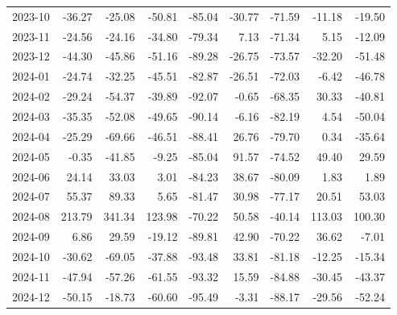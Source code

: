 \begin{table}[ht]
\begin{tabular}{lrrrrrrrr}
  2023-10 & -36.27 & -25.08 & -50.81 & -85.04 & -30.77 & -71.59 & -11.18 & -19.50 \\ 
  2023-11 & -24.56 & -24.16 & -34.80 & -79.34 & 7.13 & -71.34 & 5.15 & -12.09 \\ 
  2023-12 & -44.30 & -45.86 & -51.16 & -89.28 & -26.75 & -73.57 & -32.20 & -51.48 \\ 
  2024-01 & -24.74 & -32.25 & -45.51 & -82.87 & -26.51 & -72.03 & -6.42 & -46.78 \\ 
  2024-02 & -29.24 & -54.37 & -39.89 & -92.07 & -0.65 & -68.35 & 30.33 & -40.81 \\ 
  2024-03 & -35.35 & -52.08 & -49.65 & -90.14 & -6.16 & -82.19 & 4.54 & -50.04 \\ 
  2024-04 & -25.29 & -69.66 & -46.51 & -88.41 & 26.76 & -79.70 & 0.34 & -35.64 \\ 
  2024-05 & -0.35 & -41.85 & -9.25 & -85.04 & 91.57 & -74.52 & 49.40 & 29.59 \\ 
  2024-06 & 24.14 & 33.03 & 3.01 & -84.23 & 38.67 & -80.09 & 1.83 & 1.89 \\ 
  2024-07 & 55.37 & 89.33 & 5.65 & -81.47 & 30.98 & -77.17 & 20.51 & 53.03 \\ 
  2024-08 & 213.79 & 341.34 & 123.98 & -70.22 & 50.58 & -40.14 & 113.03 & 100.30 \\ 
  2024-09 & 6.86 & 29.59 & -19.12 & -89.81 & 42.90 & -70.22 & 36.62 & -7.01 \\ 
  2024-10 & -30.62 & -69.05 & -37.88 & -93.48 & 33.81 & -81.18 & -12.25 & -15.34 \\ 
  2024-11 & -47.94 & -57.26 & -61.55 & -93.32 & 15.59 & -84.88 & -30.45 & -43.37 \\ 
  2024-12 & -50.15 & -18.73 & -60.60 & -95.49 & -3.31 & -88.17 & -29.56 & -52.24 \\ 
   \hline
\end{tabular}
\end{table}
